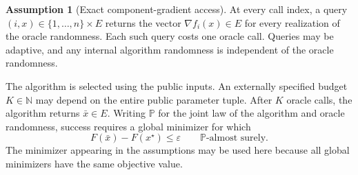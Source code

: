 \documentclass[10pt]{article}
\theoremstyle{definition}
\newtheorem{assumption}{Assumption}
\begin{document}
\begin{assumption}[Exact component-gradient access]
At every call index, a query $(i,x)\in\{1,\ldots,n\}\times E$ returns the vector $\nabla f_i(x)\in E$ for every realization of the oracle randomness. Each such query costs one oracle call. Queries may be adaptive, and any internal algorithm randomness is independent of the oracle randomness.
\end{assumption}

The algorithm is selected using the public inputs. An externally specified budget $K\in\mathbb{N}$ may depend on the entire public parameter tuple. After $K$ oracle calls, the algorithm returns $\bar{x}\in E$. Writing $\mathbb{P}$ for the joint law of the algorithm and oracle randomness, success requires a global minimizer for which
\[
F(\bar{x})-F(x^\star)\leq\varepsilon
\qquad\mathbb{P}\text{-almost surely}.
\]
The minimizer appearing in the assumptions may be used here because all global minimizers have the same objective value.
\end{document}
